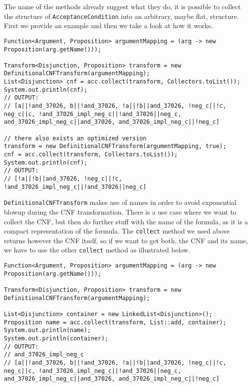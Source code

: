 \documentclass{scrartcl}[a4paper,10pt]
\newcommand{\jlstinline}[1]{\lstinline[style=java]|#1|}
\begin{document}
The name of the methods already suggest what they do, it is possible to collect the structure of \jlstinline{AcceptanceCondition} into an arbitrary, maybe flat, structure. First we provide an example and then we take a look at how it works.

\begin{lstlisting}[style=java,caption=Transforming AcceptanceCondition into CNF]
Function<Argument, Proposition> argumentMapping = (arg -> new Proposition(arg.getName()));

Transform<Disjunction, Proposition> transform = new DefinitionalCNFTransform(argumentMapping);
List<Disjunction> cnf = acc.collect(transform, Collectors.toList());
System.out.println(cnf);
// OUTPUT:
// [a||!and_37026, b||!and_37026, !a||!b||and_37026, !neg_c||!c, neg_c||c, !and_37026_impl_neg_c||!and_37026||neg_c, and_37026_impl_neg_c||and_37026, and_37026_impl_neg_c||!neg_c]

// there also exists an optimized version
transform = new DefinitionalCNFTransform(argumentMapping, true);
cnf = acc.collect(transform, Collectors.toList());
System.out.println(cnf);
// OUTPUT:
// [!a||!b||and_37026, !neg_c||!c, !and_37026_impl_neg_c||!and_37026||neg_c]
\end{lstlisting}

\jlstinline{DefinitionalCNFTransform} makes use of names in order to avoid exponential blowup during the CNF transformation. There is a use case where we want to collect the CNF, but then do further stuff with the name of the formula, as it is a compact representation of the formula. The \jlstinline{collect} method we used above returns however the CNF itself, so if we want to get both, the CNF and its name, we have to use the other \jlstinline{collect} method as illustrated below.

\begin{lstlisting}[style=java,caption=Transforming AcceptanceCondition into CNF]
Function<Argument, Proposition> argumentMapping = (arg -> new Proposition(arg.getName()));

Transform<Disjunction, Proposition> transform = new DefinitionalCNFTransform(argumentMapping);

List<Disjunction> container = new LinkedList<Disjunction>();
Proposition name = acc.collect(transform, List::add, container);
System.out.println(name);
System.out.println(container);
// OUTPUT:
// and_37026_impl_neg_c
// [a||!and_37026, b||!and_37026, !a||!b||and_37026, !neg_c||!c, neg_c||c, !and_37026_impl_neg_c||!and_37026||neg_c, and_37026_impl_neg_c||and_37026, and_37026_impl_neg_c||!neg_c]
\end{lstlisting}
\end{document}
